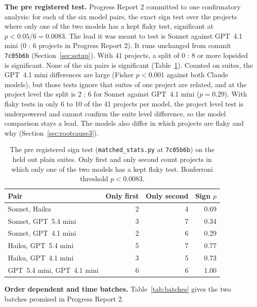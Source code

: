 \textbf{The pre registered test.} Progress Report 2 committed to one confirmatory analysis: for each of the six model pairs, the exact sign test over the projects where only one of the two models has a kept flaky test, significant at $p < 0.05/6 = 0.0083$. The lead it was meant to test is Sonnet against GPT~4.1 mini (0 : 6 projects in Progress Report 2). It runs unchanged from commit \texttt{7c05b6b} (Section~\ref{sec:setup}). With 41 projects, a split of 0 : 8 or more lopsided is significant. None of the six pairs is significant (Table~\ref{tab:prereg}). Counted on suites, the GPT~4.1 mini differences are large (Fisher $p < 0.001$ against both Claude models), but those tests ignore that suites of one project are related, and at the project level the split is 2 : 6 for Sonnet against GPT~4.1 mini ($p = 0.29$). With flaky tests in only 6 to 10 of the 41 projects per model, the project level test is underpowered and cannot confirm the suite level difference, so the model comparison stays a lead. The models also differ in which projects are flaky and why (Section~\ref{sec:rootcause3}).

\begin{table}[htbp]
\caption{The pre registered sign test (\texttt{matched\_stats.py} at \texttt{7c05b6b}) on the held out plain suites. Only first and only second count projects in which only one of the two models has a kept flaky test. Bonferroni threshold $p < 0.0083$.}
\label{tab:prereg}
\small
\setlength{\tabcolsep}{3pt}
\begin{tabularx}{\columnwidth}{Xrrr}
\toprule
Pair & Only first & Only second & Sign $p$ \\
\midrule
Sonnet, Haiku & 2 & 4 & 0.69 \\
Sonnet, GPT~5.4 mini & 3 & 7 & 0.34 \\
Sonnet, GPT~4.1 mini & 2 & 6 & 0.29 \\
Haiku, GPT~5.4 mini & 5 & 7 & 0.77 \\
Haiku, GPT~4.1 mini & 3 & 5 & 0.73 \\
GPT~5.4 mini, GPT~4.1 mini & 6 & 6 & 1.00 \\
\bottomrule
\end{tabularx}
\end{table}

\textbf{Order dependent and time batches.} Table~\ref{tab:batches} gives the two batches promised in Progress Report 2.

